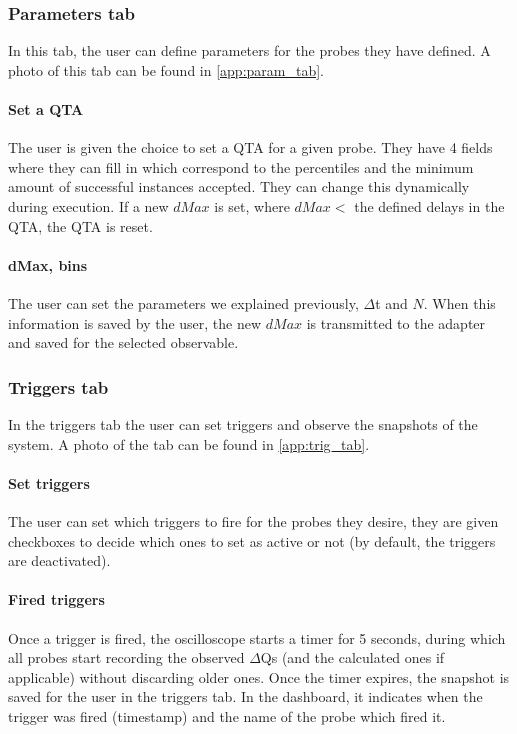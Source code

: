     \subsubsection{Parameters tab}
        In this tab, the user can define parameters for the probes they have defined. A photo of this tab can be found in \cref{app:param_tab}.

    \paragraph{Set a QTA}
        The user is given the choice to set a QTA for a given probe. They have 4 fields where they can fill in which correspond to the percentiles and the minimum amount of successful instances accepted. They can change this dynamically during execution. If a new $dMax$ is set, where $dMax < $ the defined delays in the QTA, the QTA is reset.

    \paragraph{dMax, bins}
        The user can set the parameters we explained previously, $\Delta$t and $N$. When this information is saved by the user, the new $dMax$ is transmitted to the adapter and saved for the selected observable.

    \subsubsection{Triggers tab}
        In the triggers tab the user can set triggers and observe the snapshots of the system. A photo of the tab can be found in \cref{app:trig_tab}.

    \paragraph{Set triggers}
        The user can set which triggers to fire for the probes they desire, they are given checkboxes to decide which ones to set as active or not (by default, the triggers are deactivated).
    
    \paragraph{Fired triggers}
        Once a trigger is fired, the oscilloscope starts a timer for 5 seconds, during which all probes start recording the observed $\Delta$Qs (and the calculated ones if applicable) without discarding older ones. Once the timer expires, the snapshot is saved for the user in the triggers tab. In the dashboard, it indicates when the trigger was fired (timestamp) and the name of the probe which fired it.
    
